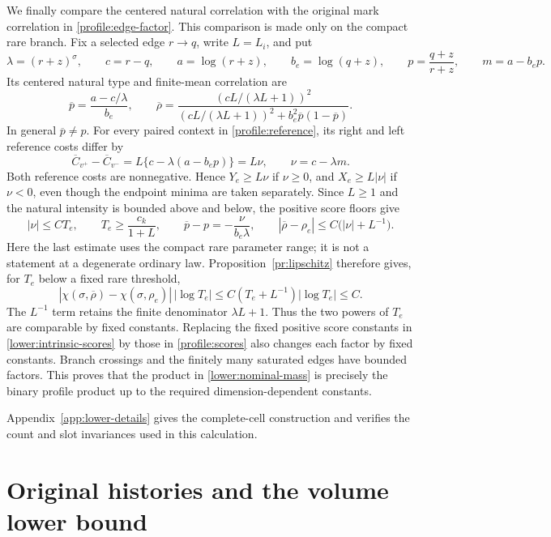 We finally compare the centered natural correlation with the original
mark correlation in \eqref{profile:edge-factor}.  This comparison is
made only on the compact rare branch.  Fix a selected edge $r\to q$,
write $L=L_i$, and put
\[
 \lambda=(r+z)^\sigma,\qquad c=r-q,\qquad
 a=\log(r+z),\qquad b_e=\log(q+z),\qquad
 p=\frac{q+z}{r+z},\qquad m=a-b_ep.
\]
Its centered natural type and finite-mean correlation are
\begin{equation}
 \overline p=\frac{a-c/\lambda}{b_e},\qquad
 \overline\rho=\frac{(cL/(\lambda L+1))^2}
 {(cL/(\lambda L+1))^2+b_e^2\overline p(1-\overline p)}.
 \label{lower:natural-correlation}
\end{equation}
In general $\overline p\ne p$.  For every paired context in
\eqref{profile:reference}, its right and left reference costs differ by
\[
 \overline C_{v^+}-\overline C_{v^-}
       =L\{c-\lambda(a-b_ep)\}=L\nu,
       \qquad \nu=c-\lambda m.
\]
Both reference costs are nonnegative.  Hence $Y_e\ge L\nu$ if
$\nu\ge0$, and $X_e\ge L|\nu|$ if $\nu<0$, even though the
endpoint minima are taken separately.  Since $L\ge1$ and the natural
intensity is bounded above and below, the positive score floors give
\[
 |\nu|\le C T_e,\qquad T_e\ge\frac{c_k}{1+L},\qquad
 \overline p-p=-\frac{\nu}{b_e\lambda},\qquad
 |\overline\rho-\rho_e|\le C\bigl(|\nu|+L^{-1}\bigr).
\]
Here the last estimate uses the compact rare parameter range; it is
not a statement at a degenerate ordinary law.  Proposition~\ref{pr:lipschitz}
therefore gives, for $T_e$ below a fixed rare threshold,
\[
 |\chi(\sigma,\overline\rho)-\chi(\sigma,\rho_e)|\,|\log T_e|
 \le C(T_e+L^{-1})|\log T_e|\le C.
\]
The $L^{-1}$ term retains the finite denominator $\lambda L+1$.
Thus the two powers of $T_e$ are comparable by fixed constants.
Replacing the fixed positive score constants in
\eqref{lower:intrinsic-scores} by those in \eqref{profile:scores}
also changes each factor by fixed constants.  Branch crossings and
the finitely many saturated edges have bounded factors.  This proves
that the product in \eqref{lower:nominal-mass} is precisely the binary
profile product up to the required dimension-dependent constants.

Appendix~\ref{app:lower-details} gives the complete-cell construction
and verifies the count and slot invariances used in this calculation.

\section{Original histories and the volume lower bound}
